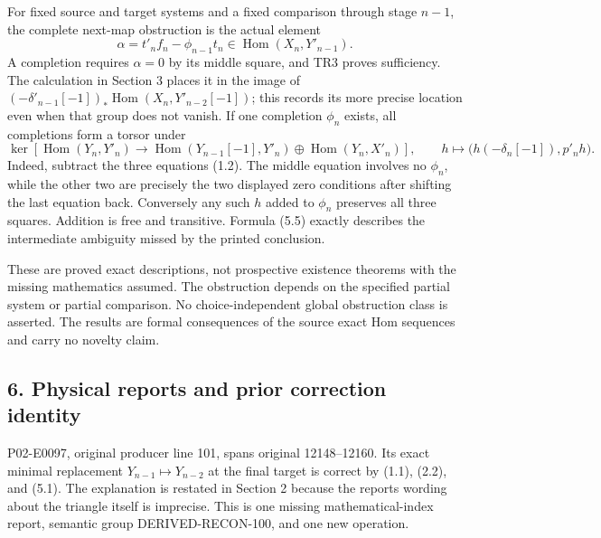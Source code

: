 \documentclass[11pt]{article}
\begin{document}
For fixed source and target systems and a fixed comparison through stage \(n-1\),\allowbreak{} the complete next-map obstruction is the actual element \[
\alpha=t'_nf_n-\phi_{n-1}t_n\in\operatorname{Hom}(X_n,Y'_{n-1}). \tag{5.4}
\] A completion requires \(\alpha=0\) by its middle square,\allowbreak{} and TR3 proves sufficiency. The calculation in Section 3 places it in the image of \((-\delta'_{n-1}[-1])_*\operatorname{Hom}(X_n,Y'_{n-2}[-1])\); this records its more precise location even when that group does not vanish. If one completion \(\phi_n\) exists,\allowbreak{} all completions form a torsor under \[
\ker\!\left[
\operatorname{Hom}(Y_n,Y'_n)\longrightarrow
\operatorname{Hom}(Y_{n-1}[-1],Y'_n)\oplus\operatorname{Hom}(Y_n,X'_n)
\right],\qquad
h\longmapsto\big(h(-\delta_n[-1]),p'_nh\big). \tag{5.5}
\] Indeed,\allowbreak{} subtract the three equations (1.2)\allowbreak{}. The middle equation involves no \(\phi_n\),\allowbreak{} while the other two are precisely the two displayed zero conditions after shifting the last equation back. Conversely any such \(h\) added to \(\phi_n\) preserves all three squares. Addition is free and transitive. Formula (5.5)\allowbreak{} exactly describes the intermediate ambiguity missed by the printed conclusion.

These are proved exact descriptions,\allowbreak{} not prospective existence theorems with the missing mathematics assumed. The obstruction depends on the specified partial system or partial comparison. No choice-independent global obstruction class is asserted. The results are formal consequences of the source exact Hom sequences and carry no novelty claim.

\subsection{6. Physical reports and prior correction identity}\label{proofs-12008-12370-physical-reports-and-prior-correction-identity}

P02-E0097,\allowbreak{} original producer line 101,\allowbreak{} spans original 12148–\allowbreak{}12160. Its exact minimal replacement \(Y_{n-1}\mapsto Y_{n-2}\) at the final target is correct by (1.1)\allowbreak{},\allowbreak{} (2.2)\allowbreak{},\allowbreak{} and (5.1)\allowbreak{}. The explanation is restated in Section 2 because the report\textquotesingle s wording about the triangle itself is imprecise. This is one missing mathematical-index report,\allowbreak{} semantic group DERIVED-RECON-100,\allowbreak{} and one new operation.
\end{document}
